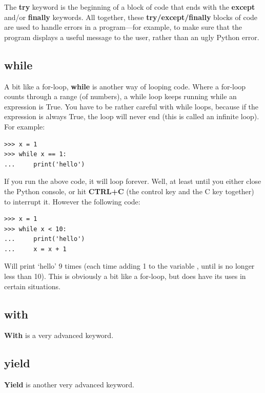 The \textbf{try} keyword is the beginning of a block of code that ends with the \textbf{except} and/or \textbf{finally} keywords.  All together, these \textbf{try/except/finally} blocks of code are used to handle errors in a program---for example, to make sure that the program displays a useful message to the user, rather than an ugly Python error.

\subsection*{while}

A bit like a for-loop, \textbf{while} is another way of looping code.  Where a for-loop counts through a range (of numbers), a while loop keeps running while an expression is True.  You have to be rather careful with while loops, because if the expression is always True, the loop will never end (this is called an infinite loop).  For example:

\begin{listingignore}
\begin{verbatim}
>>> x = 1
>>> while x == 1:
...     print('hello')
\end{verbatim}
\end{listingignore}

If you run the above code, it will loop forever.  Well, at least until you either close the Python console, or hit \textbf{CTRL+C} (the control key and the C key together) to interrupt it. However the following code:

\begin{listing}
\begin{verbatim}
>>> x = 1
>>> while x < 10:
...     print('hello')
...     x = x + 1
\end{verbatim}
\end{listing}

Will print `hello' 9 times (each time adding 1 to the variable , until  is no longer less than 10). This is obviously a bit like a for-loop, but does have its uses in certain situations.

\subsection*{with}

\textbf{With} is a very advanced keyword.

\subsection*{yield}
\textbf{Yield} is another very advanced keyword.

\newpage
